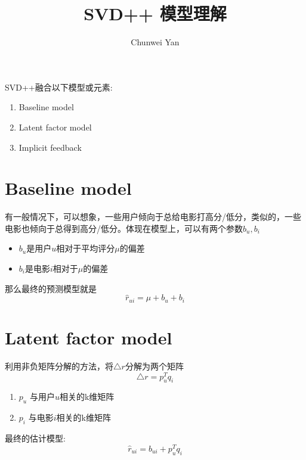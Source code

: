 \documentclass[a4paper]{article}
\author{Chunwei Yan}
\title{SVD++ 模型理解}
\begin{document}
    \maketitle
SVD++融合以下模型或元素:
\begin{enumerate}
\item Baseline model
\item Latent factor model
\item Implicit feedback
\end{enumerate}

\section{Baseline model}
\par 有一般情况下，可以想象，一些用户倾向于总给电影打高分/低分，类似的，一些电影也倾向于总得到高分/低分。体现在模型上，可以有两个参数$b_u, b_i$
\begin{itemize}
\item $b_u$是用户$u$相对于平均评分$\mu$的偏差
\item $b_i$是电影$i$相对于$\mu$的偏差
\end{itemize}
\par 那么最终的预测模型就是
\begin{equation}
    \hat{r}_{ui} = \mu + b_u + b_i
\end{equation}

\section{Latent factor model}
\par 利用非负矩阵分解的方法，将$\triangle r$分解为两个矩阵
\begin{equation}
    \triangle r = p_u^T q_i
\end{equation}
\begin{enumerate}
\item $p_u$ 与用户$u$相关的k维矩阵
\item $p_i$ 与电影$i$相关的k维矩阵
\end{enumerate}
\par 最终的估计模型:
\begin{equation}
    \hat{r}_{ui} = b_{ui} + p_u^T q_i
\end{equation}
\end{document}
